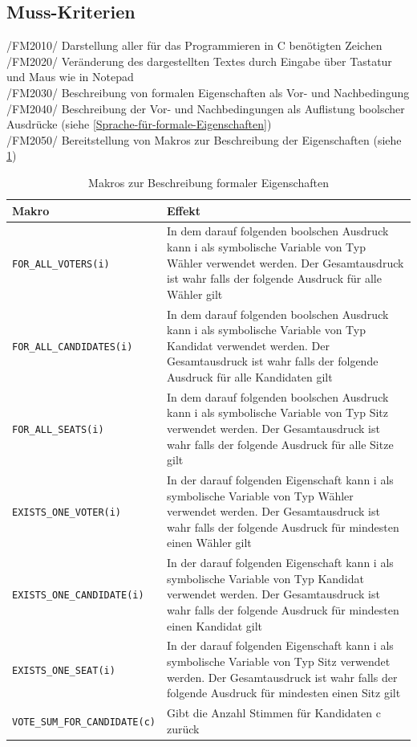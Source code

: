 \documentclass[a4paper]{scrreprt}
\begin{document}
\subsection{Muss-Kriterien}
/FM2010/ Darstellung aller für das Programmieren in C benötigten Zeichen \\
/FM2020/ Veränderung des dargestellten Textes durch Eingabe über Tastatur und Maus wie in Notepad \\
/FM2030/ Beschreibung von formalen Eigenschaften als Vor- und Nachbedingung  \\
/FM2040/ Beschreibung der Vor- und Nachbedingungen als Auflistung boolscher Ausdrücke (siehe \ref{Sprache-für-formale-Eigenschaften})\\
/FM2050/ Bereitstellung von Makros zur Beschreibung der Eigenschaften (siehe \ref{table:Macros_for_formal_Attributes}) \\

\begin{table}[H]
\caption{Makros zur Beschreibung formaler Eigenschaften}
\begin{tabular}{|p{5cm}|p{10cm}|}

Makro & Effekt \\
\hline 
\verb!FOR_ALL_VOTERS(i)! & In dem darauf folgenden boolschen Ausdruck kann i als symbolische Variable von Typ Wähler verwendet werden. Der Gesamtausdruck ist wahr falls der folgende Ausdruck für alle Wähler gilt \\
\hline 
\verb!FOR_ALL_CANDIDATES(i)! & In dem darauf folgenden boolschen Ausdruck kann i als symbolische Variable von Typ Kandidat verwendet werden. Der Gesamtausdruck ist wahr falls der folgende Ausdruck für alle Kandidaten gilt \\
\hline 
\verb!FOR_ALL_SEATS(i)! & In dem darauf folgenden boolschen Ausdruck kann i als symbolische Variable von Typ Sitz verwendet werden. Der Gesamtausdruck ist wahr falls der folgende Ausdruck für alle Sitze gilt \\
\hline 
\verb!EXISTS_ONE_VOTER(i)! & In der darauf folgenden Eigenschaft kann i als symbolische Variable von Typ Wähler verwendet werden. Der Gesamtausdruck ist wahr falls der folgende Ausdruck für mindesten einen Wähler gilt \\
\hline 
\verb!EXISTS_ONE_CANDIDATE(i)! & In der darauf folgenden Eigenschaft kann i als symbolische Variable von Typ Kandidat verwendet werden. Der Gesamtausdruck ist wahr falls der folgende Ausdruck für mindesten einen Kandidat gilt \\
\hline 
\verb!EXISTS_ONE_SEAT(i)! & In der darauf folgenden Eigenschaft kann i als symbolische Variable von Typ Sitz verwendet werden. Der Gesamtausdruck ist wahr falls der folgende Ausdruck für mindesten einen Sitz gilt \\
\hline 
\verb!VOTE_SUM_FOR_CANDIDATE(c)! & Gibt die Anzahl Stimmen für Kandidaten c zurück\\

\end{tabular}
\label{table:Macros_for_formal_Attributes}
\end{table}
\end{document}
